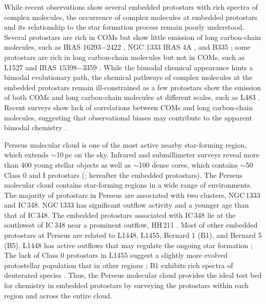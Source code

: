 \documentclass[twocolumn]{aastex62}
\begin{document}
While recent observations show several embedded protostars with rich spectra of complex molecules, the occurrence of complex molecules at embedded protostars and its relationship to the star formation process remain poorly understood.  Several protostars are rich in COMs but show little emission of long carbon-chain molecules, such as IRAS 16293$-$2422 \citep{2016AA...595A.117J}, NGC 1333 IRAS 4A \citep{2004ApJ...615..354B,2019ApJ...872..196S}, and B335 \citep{2016ApJ...830L..37I,2019ApJ...873L..21I}; some protostars are rich in long carbon-chain molecules but not in COMs, such as L1527 \citep{2010ApJ...722.1633S} and IRAS 15398$-$3359 \citep{2009ApJ...697..769S}.  While the bimodal chemical appearance hints a bimodal evolutionary path, the chemical pathways of complex molecules at the embedded protostars remain ill-constrained as a few protostars show the emission of both COMs and long carbon-chain molecules at different scales, such as L483 \citep{2017ApJ...837..174O}.  Recent surveys show lack of correlations between COMs and long carbon-chain molecules, suggesting that observational biases may contribute to the apparent bimodal chemistry \citep{2016ApJ...833..125G,2018ApJS..236...52H}.

Perseus molecular cloud is one of the most active nearby star-forming region, which extends $\sim$10\,pc on the sky.  Infrared and submillimeter surveys reveal more than 400 young stellar objects as well as $\sim$100 dense cores, which contains $\sim$50 Class 0 and I protostars (\citealt{2005AA...440..151H,2008ApJ...683..822J,2013AJ....145...94D}; hereafter the embedded protostars).  The Perseus molecular cloud contains star-forming regions in a wide range of environments.  The majority of protostars in Perseus are associated with two clusters, NGC\,1333 and IC\,348.  NGC\,1333 has significant outflow activity \citep{2013ApJ...774...22P} and a younger age than that of IC\,348.  The embedded protostars associated with IC\,348 lie at the southwest of IC\,348 near a prominent outflow, HH\,211 \citep[e.g., ][]{2009ApJ...699.1584L}.  Most of other embedded protostars at Perseus are related to L1448, L1455, Bernard 1 (B1), and Bernard 5 (B5).  L1448 has active outflows that may regulate the ongoing star formation \citep{2010MNRAS.408.1516C}; The lack of Class 0 protostars in L1455 suggest a slightly more evolved protostellar population that in other regions \citep{2007AA...468.1009H}; B1 exhibits rich spectra of deuterated species \citep{2005AA...438..585R,2005ApJ...620..308M}.  Thus, the Perseus molecular cloud provides the ideal test bed for chemistry in embedded protostars by surveying the protostars within each region and across the entire cloud.
\end{document}
